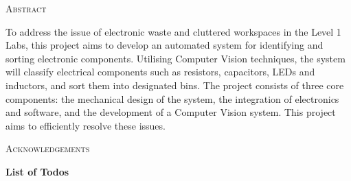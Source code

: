 \documentclass[12pt, a4paper]{article}
\let\oldsection\section
\renewcommand\section[1]{
  \pagebreak\
  \oldsection{#1}
  {\hypersetup{hidelinks}\secttoc\thispagestyle{fancy}}
}
\begin{document}
\newpage
\vspace*{\fill}
\begin{center}
  \large\textsc{Abstract} \\
\end{center}
\noindent To address the issue of electronic waste and cluttered workspaces in the Level 1 Labs, this project aims to develop an automated system for identifying and sorting electronic components. Utilising Computer Vision techniques, the system will classify electrical components such as resistors, capacitors, LEDs and inductors, and sort them into designated bins. The project consists of three core components: the mechanical design of the system, the integration of electronics and software, and the development of a Computer Vision system. This project aims to efficiently resolve these issues. \\
\vspace*{\fill}

\newpage
\vspace*{\fill}
\begin{center}
  \large\textsc{Acknowledgements} \\
\end{center}
\lipsum[1-2]
\vspace*{\fill}
\newpage

{\hypersetup{hidelinks}\tableofcontents\thispagestyle{fancy}}
\newcommand{\neutralizelistoftodos}{
  \begingroup
  \renewcommand{\section}[1]{}
  \newpage
  {\large\textbf{List of Todos}}
  \listoftodos
  \endgroup
}
\neutralizelistoftodos








\section{References}




\end{document}
